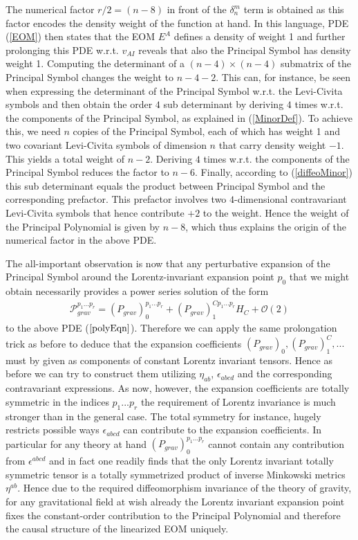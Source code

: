 The numerical factor $r/2 = (n-8)$ in front of the $\delta^m_n$ term is obtained as this factor encodes the density weight of the function at hand. In this language, PDE (\ref{EOM}) then states that the EOM $E^A$ defines a density of weight 1 and further prolonging this PDE w.r.t. $v_{AI}$ reveals that also the Principal Symbol has density weight 1. Computing the determinant of a $(n-4) \times (n-4)$ submatrix of the Principal Symbol changes the weight to $n-4-2$. This can, for instance, be seen when expressing the determinant of the Principal Symbol w.r.t. the Levi-Civita symbols and then obtain the order $4$ sub determinant by deriving $4$ times w.r.t. the components of the Principal Symbol, as explained in (\ref{MinorDef}). To achieve this, we need $n$ copies of the Principal Symbol, each of which has weight 1 and two covariant Levi-Civita symbols of dimension $n$ that carry density weight $-1$. This yields a total weight of $n-2$. Deriving $4$ times w.r.t. the components of the Principal Symbol reduces the factor to $n-6$. Finally, according to (\ref{diffeoMinor}) this sub determinant equals the product between Principal Symbol and the corresponding prefactor. This prefactor involves two $4$-dimensional contravariant Levi-Civita symbols that hence contribute $+2$ to the weight. Hence the weight of the Principal Polynomial is given by $n-8$, which thus explains the origin of the numerical factor in the above PDE. 

The all-important observation is now that any perturbative expansion of the Principal Symbol around the Lorentz-invariant expansion point $p_0$ that we might obtain necessarily provides a power series solution of the form
\begin{align}
    \mathcal{P}_{grav}^{{p_1}...{p_{r}}} = (P_{grav})^{{p_1}...{p_{r}}}_0 + (P_{grav})_1^{C{p_1}...{p_{r}}} H_C + \mathcal{O}(2)
\end{align}
to the above PDE ($\ref{polyEqn}$). Therefore we can apply the same prolongation trick as before to deduce that the expansion coefficients $(P_{grav})_0, (P_{grav})_1^C,...$ must by given as components of constant Lorentz invariant tensors. Hence as before we can try to construct them utilizing $\eta_{ab}$, $\epsilon_{abcd}$ and the corresponding contravariant expressions. As now, however, the expansion coefficients are totally symmetric in the indices $p_1...p_r$ the requirement of Lorentz invariance is much stronger than in the general case. The total symmetry for instance, hugely restricts possible ways $\epsilon_{abcd}$ can contribute to the expansion coefficients. In particular for any theory at hand $(P_{grav})_0^{{p_1}...{p_{r}}}$ cannot contain any contribution from $\epsilon^{abcd}$ and in fact one readily finds that the only Lorentz invariant totally symmetric tensor is a totally symmetrized product of inverse Minkowski metrics $\eta^{ab}$. Hence due to the required diffeomorphism invariance of the theory of gravity, for any gravitational field at wish already the Lorentz invariant expansion point fixes the constant-order contribution to the Principal Polynomial and therefore the causal structure of the linearized EOM uniquely.

